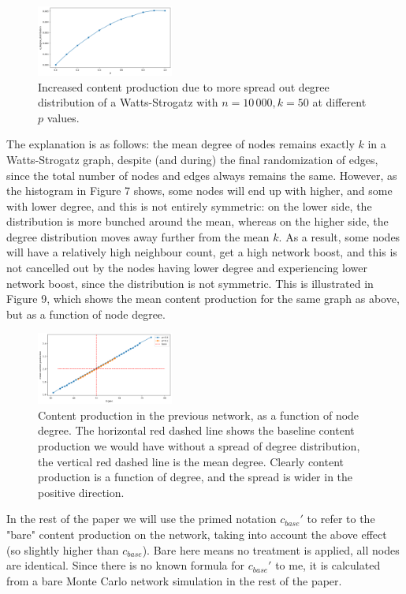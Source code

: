 \documentclass[final,5p,times,twocolumn,authoryear]{elsarticle}
\begin{document}
\begin{figure}[h]
	\centering 
	\includegraphics[width=0.4\textwidth]{figure-8.png}	
	\caption{Increased content production due to more spread out degree distribution of a Watts-Strogatz with $n=10\,000, k=50$ at different $p$ values.} 
\end{figure}

The explanation is as follows: the mean degree of nodes remains exactly $k$ in a Watts-Strogatz graph, despite (and during) the final randomization of edges, since the total number of nodes and edges always remains the same. However, as the histogram in Figure 7 shows, some nodes will end up with higher, and some with lower degree, and this is not entirely symmetric: on the lower side, the distribution is more bunched around the mean, whereas on the higher side, the degree distribution moves away further from the mean $k$. As a result, some nodes will have a relatively high neighbour count, get a high network boost, and this is not cancelled out by the nodes having lower degree and experiencing lower network boost, since the distribution is not symmetric. This is illustrated in Figure 9, which shows the mean content production for the same graph as above, but as a function of node degree.

\begin{figure}[h]
	\centering 
	\includegraphics[width=0.4\textwidth]{figure-9.png}	
	\caption{Content production in the previous network, as a function of node degree. The horizontal red dashed line shows the baseline content production we would have without a spread of degree distribution, the vertical red dashed line is the mean degree. Clearly content production is a function of degree, and the spread is wider in the positive direction.} 
\end{figure}

In the rest of the paper we will use the primed notation $c_{base}\prime$ to refer to the "bare" content production on the network, taking into account the above effect (so slightly higher than $c_{base}$). Bare here means no treatment is applied, all nodes are identical. Since there is no known formula for $c_{base}\prime$ to me, it is calculated from a bare Monte Carlo network simulation in the rest of the paper.
\end{document}

